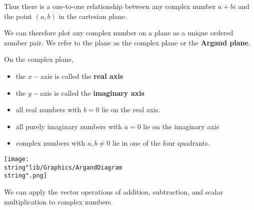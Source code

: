 \documentclass[11pt,a4paper]{book}
\begin{document}
Thus there is a one-to-one relationship between any complex number
$a+bi$ and the point $\left(a,b\right)$ in the cartesian plane.

We can therefore plot any complex number on a plane as a unique ordered
number pair. We refer to the plane as the complex plane or the \textbf{Argand
plane}.

\medskip{}

\begin{minipage}[t]{0.6\textwidth}

On the complex plane,

\begin{itemize}

\item  the $x-$axis is called the \textbf{real axis}

\item  the $y-$axis is called the \textbf{imaginary axis}

\item  all real numbers with $b=0$ lie on the real axis.

\item  all purely imaginary numbers with $a=0$ lie on the imaginary
axis

\item  complex numbers with $a,b\neq0$ lie in one of the four quadrants.

\end{itemize}

\end{minipage}
\begin{minipage}[t]{0.1\textwidth}
\begin{center}
\texttt{[image: \\string"lib/Graphics/ArgandDiagram\\string".png]}
\par\end{center}

\end{minipage}

We can apply the vector operations of addition, subtraction, and scalar
multiplication to complex numbers.
\end{document}
